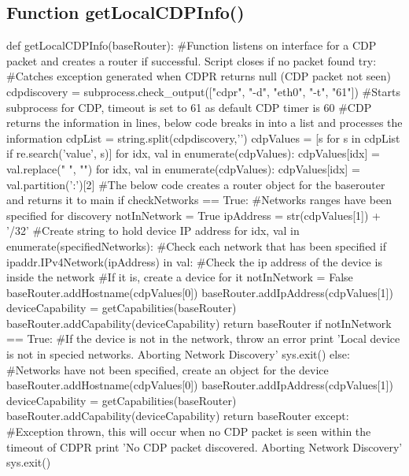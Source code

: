 \documentclass[11pt]{report}
\begin{document}
\begin{appendices}

\chapter{Function getLocalCDPInfo()}
\begin{python}
def getLocalCDPInfo(baseRouter):
	#Function listens on interface for a CDP packet and creates a router if successful. Script closes if no packet found
	try: #Catches exception generated when CDPR returns null (CDP packet not seen)
		cdpdiscovery = subprocess.check_output(["cdpr", "-d", "eth0", "-t", "61"])
		#Starts subprocess for CDP, timeout is set to 61 as default CDP timer is 60
		#CDP returns the information in lines, below code breaks in into a list and processes the information 
		cdpList = string.split(cdpdiscovery,'\n')
		cdpValues = [s for s in cdpList if re.search('value', s)]
		for idx, val in enumerate(cdpValues):
			cdpValues[idx] = val.replace(" ", "")
		for idx, val in enumerate(cdpValues):
			cdpValues[idx] = val.partition(':')[2]
		#The below code creates a router object for the baserouter and returns it to main
		if checkNetworks == True:
			#Networks ranges have been specified for discovery
			notInNetwork = True
			ipAddress = str(cdpValues[1]) + '/32'
			#Create string to hold device IP address
			for idx, val in enumerate(specifiedNetworks):
				#Check each network that has been specified
				if ipaddr.IPv4Network(ipAddress) in val:
					#Check the ip address of the device is inside the network
					#If it is, create a device for it
					notInNetwork = False
					baseRouter.addHostname(cdpValues[0])
					baseRouter.addIpAddress(cdpValues[1])
					deviceCapability = getCapabilities(baseRouter)
					baseRouter.addCapability(deviceCapability)
					return baseRouter
			if notInNetwork == True:
				#If the device is not in the network, throw an error
				print 'Local device is not in specied networks. Aborting Network Discovery'
				sys.exit()
		else:
		#Networks have not been specified, create an object for the device
		baseRouter.addHostname(cdpValues[0])
		baseRouter.addIpAddress(cdpValues[1])
		deviceCapability = getCapabilities(baseRouter)
		baseRouter.addCapability(deviceCapability)
		return baseRouter
	except:
		#Exception thrown, this will occur when no CDP packet is seen within the timeout of CDPR
		print 'No CDP packet discovered. Aborting Network Discovery'
		sys.exit()
\end{python}	


\end{appendices}
\end{document}
